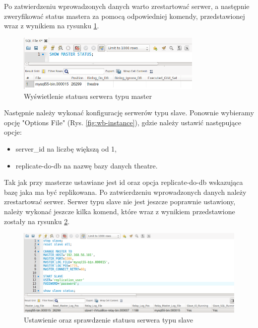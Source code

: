 \documentclass{mgr}
\begin{document}
Po zatwierdzeniu wprowadzonych danych warto zrestartować serwer, a następnie zweryfikować status mastera za pomocą odpowiedniej komendy, przedstawionej wraz z wynikiem na rysunku \ref{fig:wb-master-status}.

\begin{figure}[!ht]
	\centering
	\includegraphics[width=0.8\textwidth]{images/wb_master_status.png}
	\caption{Wyświetlenie statusu serwera typu master}
	\label{fig:wb-master-status}
\end{figure}

Następnie należy wykonać konfigurację serwerów typu slave. Ponownie wybieramy opcję "Options File" (Rys. \ref{fig:wb-instance}), gdzie należy ustawić następujące opcje:

\begin{itemize}
	\item server\_id na liczbę większą od 1,
	\item replicate-do-db na nazwę bazy danych theatre.
\end{itemize}

Tak jak przy masterze ustawiane jest id oraz opcja replicate-do-db wskazująca bazę jaka ma być replikowana. Po zatwierdzeniu wprowadzonych danych należy zrestartować serwer. Serwer typu slave nie jest jeszcze poprawnie ustawiony, należy wykonać jeszcze kilka komend, które wraz z wynikiem przedstawione zostały na rysunku \ref{fig:wb-slave-status-cmd}.

\begin{figure}[!ht]
	\centering
	\includegraphics[width=\textwidth]{images/wb_slave_status_cmd.png}
	\caption{Ustawienie oraz sprawdzenie statusu serwera typu slave}
	\label{fig:wb-slave-status-cmd}
\end{figure}
\end{document}
